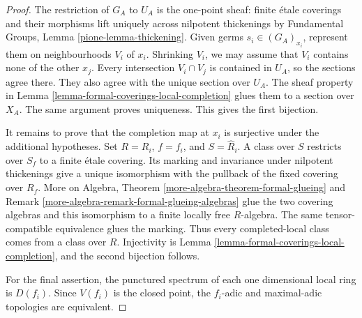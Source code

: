 \begin{proof}
The restriction of $G_A$ to $U_A$ is the one-point sheaf: finite \'etale
coverings and their morphisms lift uniquely across nilpotent thickenings by
Fundamental Groups, Lemma \ref{pione-lemma-thickening}. Given germs
$s_i \in (G_A)_{x_i}$, represent them on neighbourhoods $V_i$ of $x_i$.
Shrinking $V_i$, we may assume that $V_i$ contains none of the other $x_j$.
Every intersection $V_i \cap V_j$ is contained in $U_A$, so the sections
agree there. They also agree with the unique section over $U_A$. The sheaf
property in Lemma \ref{lemma-formal-coverings-local-completion} glues them to
a section over $X_A$. The same argument proves uniqueness. This gives the
first bijection.

It remains to prove that the completion map at $x_i$ is surjective under the
additional hypotheses. Set $R = R_i$, $f = f_i$, and
$S = \widehat R_i$. A class over $S$ restricts over $S_f$ to a finite \'etale
covering. Its marking and invariance under nilpotent thickenings give a unique
isomorphism with the pullback of the fixed covering over $R_f$. More on
Algebra, Theorem \ref{more-algebra-theorem-formal-glueing} and Remark
\ref{more-algebra-remark-formal-glueing-algebras} glue the two covering
algebras and this isomorphism to a finite locally free $R$-algebra. The same
tensor-compatible equivalence glues the marking. Thus every completed-local
class comes from a class over $R$. Injectivity is Lemma
\ref{lemma-formal-coverings-local-completion}, and the second bijection
follows.

For the final assertion, the punctured spectrum of each one dimensional
local ring is $D(f_i)$. Since $V(f_i)$ is the closed point, the $f_i$-adic
and maximal-adic topologies are equivalent.
\end{proof}


